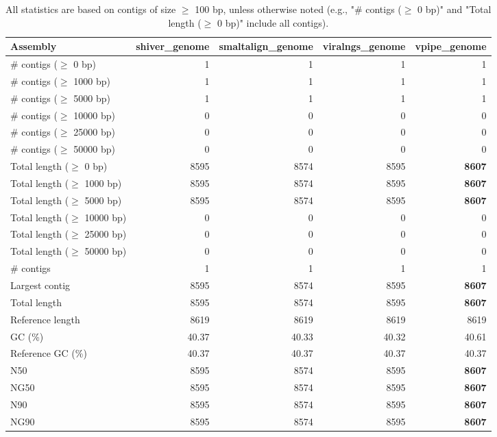 \documentclass[12pt,a4paper]{article}
\begin{document}
\begin{table}[ht]
\begin{center}
\caption{All statistics are based on contigs of size $\geq$ 100 bp, unless otherwise noted (e.g., "\# contigs ($\geq$ 0 bp)" and "Total length ($\geq$ 0 bp)" include all contigs).}
\begin{tabular}{|l*{4}{|r}|}
\hline
Assembly & shiver\_genome & smaltalign\_genome & viralngs\_genome & vpipe\_genome \\ \hline
\# contigs ($\geq$ 0 bp) & 1 & 1 & 1 & 1 \\ \hline
\# contigs ($\geq$ 1000 bp) & 1 & 1 & 1 & 1 \\ \hline
\# contigs ($\geq$ 5000 bp) & 1 & 1 & 1 & 1 \\ \hline
\# contigs ($\geq$ 10000 bp) & 0 & 0 & 0 & 0 \\ \hline
\# contigs ($\geq$ 25000 bp) & 0 & 0 & 0 & 0 \\ \hline
\# contigs ($\geq$ 50000 bp) & 0 & 0 & 0 & 0 \\ \hline
Total length ($\geq$ 0 bp) & 8595 & 8574 & 8595 & {\bf 8607} \\ \hline
Total length ($\geq$ 1000 bp) & 8595 & 8574 & 8595 & {\bf 8607} \\ \hline
Total length ($\geq$ 5000 bp) & 8595 & 8574 & 8595 & {\bf 8607} \\ \hline
Total length ($\geq$ 10000 bp) & 0 & 0 & 0 & 0 \\ \hline
Total length ($\geq$ 25000 bp) & 0 & 0 & 0 & 0 \\ \hline
Total length ($\geq$ 50000 bp) & 0 & 0 & 0 & 0 \\ \hline
\# contigs & 1 & 1 & 1 & 1 \\ \hline
Largest contig & 8595 & 8574 & 8595 & {\bf 8607} \\ \hline
Total length & 8595 & 8574 & 8595 & {\bf 8607} \\ \hline
Reference length & 8619 & 8619 & 8619 & 8619 \\ \hline
GC (\%) & 40.37 & 40.33 & 40.32 & 40.61 \\ \hline
Reference GC (\%) & 40.37 & 40.37 & 40.37 & 40.37 \\ \hline
N50 & 8595 & 8574 & 8595 & {\bf 8607} \\ \hline
NG50 & 8595 & 8574 & 8595 & {\bf 8607} \\ \hline
N90 & 8595 & 8574 & 8595 & {\bf 8607} \\ \hline
NG90 & 8595 & 8574 & 8595 & {\bf 8607} \\ \hline

\end{tabular}
\end{center}
\end{table}
\end{document}
